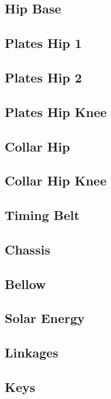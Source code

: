 \subsection{Hip Base}

\subsection{Plates Hip 1}

\subsection{Plates Hip 2}

\subsection{Plates Hip Knee}

\subsection{Collar Hip}

\subsection{Collar Hip Knee}

\subsection{Timing Belt}

\subsection{Chassis}

\subsection{Bellow}

\subsection{Solar Energy}

\subsection{Linkages}

\subsection{Keys}

